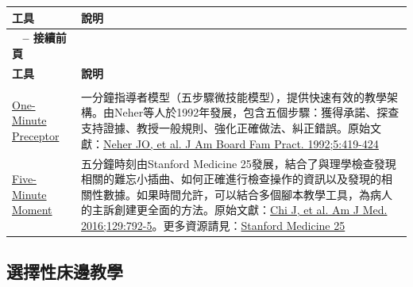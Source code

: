 \documentclass[12pt,a4paper]{article}
\begin{document}
\begin{longtable}{>{\raggedright\arraybackslash}p{4cm} >{\raggedright\arraybackslash}p{11cm}}
\toprule
\textbf{\textcolor{emergency_red}{工具}} & \textbf{\textcolor{emergency_red}{說明}} \\
\midrule
\endfirsthead

\multicolumn{2}{c}%
{{\bfseries \tablename\ \thetable{} -- 接續前頁}} \\
\toprule
\textbf{\textcolor{emergency_red}{工具}} & \textbf{\textcolor{emergency_red}{說明}} \\
\midrule
\endhead

\midrule \multicolumn{2}{r}{{接續下頁}} \\ \midrule
\endfoot

\bottomrule
\endlastfoot

\textcolor{emergency_blue}{\href{https://meded.ucsf.edu/resource/clinical-teaching-tools-omp-and-snapps}{One-Minute Preceptor}} & 一分鐘指導者模型（五步驟微技能模型），提供快速有效的教學架構。由Neher等人於1992年發展，包含五個步驟：獲得承諾、探查支持證據、教授一般規則、強化正確做法、糾正錯誤。原始文獻：\href{https://pubmed.ncbi.nlm.nih.gov/1496899/}{Neher JO, et al. J Am Board Fam Pract. 1992;5:419-424} \\

\textcolor{emergency_blue}{\href{https://www.amjmed.com/article/S0002-9343(16)30209-1/fulltext}{Five-Minute Moment}} & 五分鐘時刻由Stanford Medicine 25發展，結合了與理學檢查發現相關的難忘小插曲、如何正確進行檢查操作的資訊以及發現的相關性數據。如果時間允許，可以結合多個腳本教學工具，為病人的主訴創建更全面的方法。原始文獻：\href{https://www.amjmed.com/article/S0002-9343(16)30209-1/fulltext}{Chi J, et al. Am J Med. 2016;129:792-5}。更多資源請見：\href{https://stanfordmedicine25.stanford.edu/}{Stanford Medicine 25} \\
\end{longtable}

\subsection{選擇性床邊教學}
\end{document}
